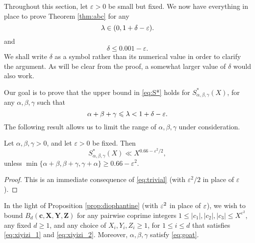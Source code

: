 Throughout this section, let $\varepsilon>0$ be small but fixed.
We now have everything in place to prove Theorem \ref{thm:abc} for any
$$
\lambda\in (0,1+\delta-\varepsilon).
$$
and
$$\delta\le 0.001-\varepsilon.$$
We shall write $\delta$ as a symbol rather than its numerical value
in order to clarify the argument. As will be clear from the proof, a somewhat larger value of $\delta$ would also work.

Our goal is to prove that the upper bound in
\eqref{eq:S*} holds for $S^{*}_{\alpha,\beta,\gamma}(X)$,
for any $\alpha,\beta,\gamma$ such that
\begin{equation}\label{eq:goat}
\alpha+\beta+\gamma\leqslant  \lambda < 1+\delta -\varepsilon.
\end{equation}
The  following result allows us to limit the range of $\alpha,\beta,\gamma$ under consideration.

\begin{proposition}\label{prop:simple}
Let $\alpha,\beta,\gamma>0$, and let $\varepsilon>0$ be fixed. Then
$$
S^*_{\alpha,\beta,\gamma}(X)\ll X^{0.66-\varepsilon^2/2},
$$
unless $\min\{\alpha+\beta, \beta+\gamma,\gamma+\alpha\}\geq 0.66-\varepsilon^2$.
\end{proposition}

\begin{proof}
This is an immediate consequence of \eqref{eq:trivial} (with $\varepsilon^2/2$ in place of $\varepsilon$).
\end{proof}


In the light of Proposition \ref{prop:diophantine} (with $\varepsilon^2$ in place of $\varepsilon$), we  wish to bound $B_d(\mathbf{c},\mathbf{X},\mathbf{Y},\mathbf{Z})$ for any
 pairwise coprime integers $1\leq |c_1|,|c_2|,|c_3|\leq X^{\varepsilon^2}$, any fixed $d\geq 1$,
 and any choice of
 $X_i,Y_i,Z_i\geq 1$, for $1\leq i\leq d$  that satisfies
  \eqref{eq:xiyizi_1} and \eqref{eq:xiyizi_2}.
  Moreover,
  $
  \alpha,\beta,\gamma
  $ satisfy \eqref{eq:goat}.

